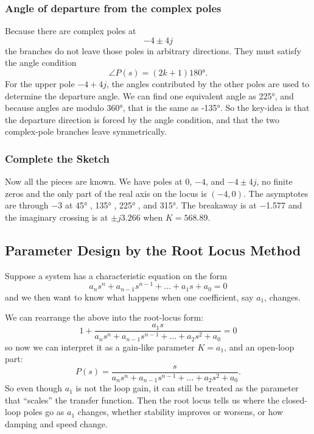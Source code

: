 \subsubsection{Angle of departure from the complex poles}
Because there are complex poles at
\begin{equation*}
  -4 \pm 4j
\end{equation*}
the branches do not leave those poles in arbitrary directions.
They must satisfy the angle condition
\begin{equation*}
  \angle P(s) = (2k+1) \ang{180} 
.\end{equation*}
For the upper pole $-4 + 4j$, the angles contributed by the other poles are used to determine the departure angle.
We can find one equivalent angle as \ang{225}, and because angles are modulo \ang{360}, that is the same as \ang{-135}.
So the key-idea is that the departure direction is forced by the angle condition, and that the two complex-pole branches leave symmetrically. 

\subsubsection{Complete the Sketch}
Now all the pieces are known.
We have poles at 0, $-4$, and $-4\pm4j$, no finite zeros and the only part of the real axis on the locus is $(-4, 0)$. 
The asymptotes are through $-3$ at \ang{45} , \ang{135} , \ang{225} , and \ang{315}.
The breakaway is at \num{-1,577} and the imaginary crossing is at $\pm j \num{3,266}$ when $K = \num{568,89}$.

\subsection{Parameter Design by the Root Locus Method}
Suppose a system has a characteristic equation on the form
\begin{equation*}
  a_n s^{n} + a_{n-1}s^{n-1} + \ldots  + a_1 s + a_0 = 0
\end{equation*}
and we then want to know what happens when one coefficient, say $a_1$, changes.

We can rearrange the above into the root-locus form:
\begin{equation*}
  1 + \frac{a_1 s}{a_ns ^{n} + a_{n-1}s^{n-1} + \ldots  + a_2 s^2 + a_0} = 0
\end{equation*}
so now we can interpret it as a gain-like parameter $K = a_1$, and an open-loop part:
\begin{equation*}
  P(s) = \frac{s}{a_ns^{n} + a_{n-1}s^{n-1} + \ldots  + a_2 s^2 + a_0}
.\end{equation*}
So even though $a_1$ is not the loop gain, it can still be treated as the parameter that ``scales'' the transfer function.
Then the root locus tells us where the closed-loop poles go as $a_1 $ changes, whether stability improves or worsens, or how damping and speed change.

